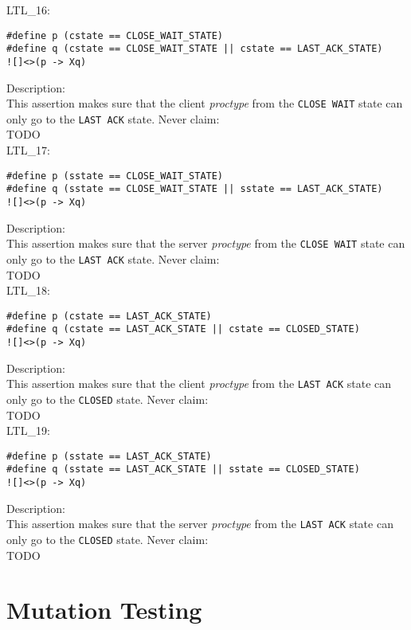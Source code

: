 \documentclass{WigReport}
\begin{document}
LTL\_16:\\
\begin{verbatim}
#define p (cstate == CLOSE_WAIT_STATE)
#define q (cstate == CLOSE_WAIT_STATE || cstate == LAST_ACK_STATE)
![]<>(p -> Xq)
\end{verbatim}
Description:\\
This assertion makes sure that the client \textit{proctype} from the \verb|CLOSE WAIT| state can only go to the \verb|LAST ACK| state.
Never claim:\\
TODO\\

LTL\_17:\\
\begin{verbatim}
#define p (sstate == CLOSE_WAIT_STATE)
#define q (sstate == CLOSE_WAIT_STATE || sstate == LAST_ACK_STATE)
![]<>(p -> Xq)
\end{verbatim}
Description:\\
This assertion makes sure that the server \textit{proctype} from the \verb|CLOSE WAIT| state can only go to the \verb|LAST ACK| state.
Never claim:\\
TODO\\

LTL\_18:\\
\begin{verbatim}
#define p (cstate == LAST_ACK_STATE)
#define q (cstate == LAST_ACK_STATE || cstate == CLOSED_STATE)
![]<>(p -> Xq)
\end{verbatim}
Description:\\
This assertion makes sure that the client \textit{proctype} from the \verb|LAST ACK| state can only go to the \verb|CLOSED| state.
Never claim:\\
TODO\\

LTL\_19:\\
\begin{verbatim}
#define p (sstate == LAST_ACK_STATE)
#define q (sstate == LAST_ACK_STATE || sstate == CLOSED_STATE)
![]<>(p -> Xq)
\end{verbatim}
Description:\\
This assertion makes sure that the server \textit{proctype} from the \verb|LAST ACK| state can only go to the \verb|CLOSED| state.
Never claim:\\
TODO\\

\section{Mutation Testing}
\end{document}
